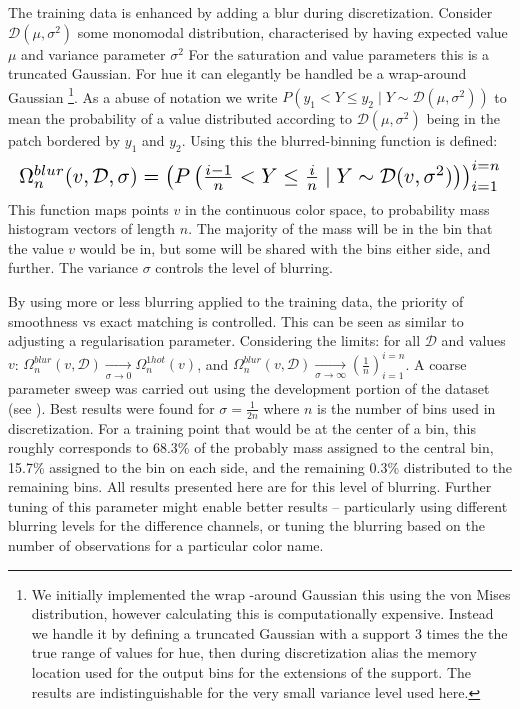 \documentclass[11pt,letterpaper]{article}
\begin{document}
The training data is enhanced by adding a blur during discretization.
Consider $\mathcal{D}(\mu,\sigma^{2})$ some monomodal distribution, characterised by having expected value $\mu$ and variance parameter $\sigma^{2}$
For the saturation and value parameters this is a truncated Gaussian.
For hue it can elegantly be handled be a wrap-around Gaussian%
\footnote{We initially implemented the wrap -around Gaussian this using 
 the von Mises distribution, however calculating this is computationally expensive.
Instead we handle it by defining a truncated Gaussian with a support 3 times the the true range of values for hue, then during discretization alias the memory location used for the output bins for the extensions of the support.
The results are indistinguishable for the very small variance level used here.}.
As a abuse of notation we write $P(y_{1}<Y\le y_{2}\mid Y\sim\mathcal{D}(\mu,\sigma^{2}))$ to mean the probability of a value distributed according to $\mathcal{D}(\mu,\sigma^{2})$ being in the patch bordered by $y_1$ and $y_2$.
Using this the blurred-binning function is defined: 
%
\begin{equation*}%
\resizebox{\columnwidth}{!}{$
	\Omega_{n}^{blur}(v,\mathcal{D},\sigma)=\left(P\left(\frac{i-1}{n}<Y\le\frac{i}{n}\mid Y\sim\mathcal{D}(v,\sigma^{2})\right)\right)_{i=1}^{i=n}
$}
\end{equation*}
This function maps points $v$ in the continuous color space, to probability mass histogram vectors of length $n$.
The majority of the mass will be in the bin that the value $v$ would be in,
but some will be shared with the bins either side, and further.
The variance $\sigma$ controls the level of blurring.

By using more or less blurring applied to the training data, the priority of smoothness vs exact matching is controlled.
This can be seen as similar to adjusting a regularisation parameter.
Considering the limits:
for all $\mathcal{D}$ and values $v$:
$\Omega_n^{blur}(v, \mathcal{D}) \underset{\sigma\to0}{\longrightarrow} \Omega_n^{1hot}(v)$,
and $\Omega_n^{blur}(v, \mathcal{D}) \underset{\sigma\to\infty}{\longrightarrow} \left(\frac{1}{n}\right)_{i=1}^{i=n}$.
A coarse parameter sweep was carried out using the development portion of the dataset (see ).
Best results were found for $\sigma = \frac{1}{2n}$ where $n$ is the number of bins used in discretization.
For a training point that would be at the center of a bin, this roughly corresponds to 68.3\% of the probably mass assigned to the central bin, 15.7\% assigned to the bin on each side, and the remaining 0.3\% distributed to the remaining bins.
All results presented here are for this level of blurring.
Further tuning of this parameter might enable better results -- particularly using different blurring levels for the difference channels, or tuning the blurring based on the number of observations for a particular color name.
\end{document}
